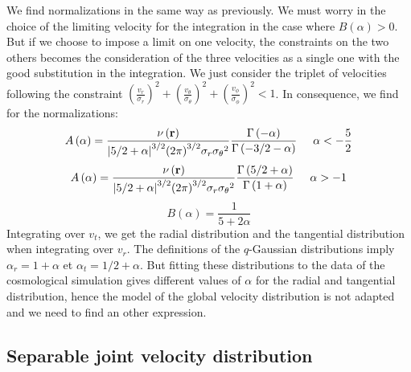 We find normalizations in the same way as previously. We must worry in the
choice of the limiting velocity for the integration in the case where
$B\left(\alpha\right)>0$. But if we choose to impose a limit on one
velocity, the constraints on the two others becomes the consideration of the
three velocities as a single one with the good substitution in the
integration. We just consider the triplet of velocities following the
constraint ${\left(\frac{v_r}{\sigma_r}\right)}^2+
{\left(\frac{v_\theta}{\sigma_\theta}\right)}^2+
{\left(\frac{v_\phi}{\sigma_\phi}\right)}^2<1$. In consequence, we find for
the normalizations:
%
\begin{equation}
    A\left(\alpha\right)=
    \frac{\nu\left(\textbf{r}\right)}
    {{\left|5/2+\alpha\right|}^{3/2}{\left(2\pi\right)}^{3/2}
        \sigma_r{\sigma_\theta}^2}
    \frac{\Gamma\left(-\alpha\right)}
        {\Gamma\left(-3/2-\alpha\right)}\hspace{0.5cm}\alpha<-\frac{5}{2}
\end{equation}
%
\begin{equation}
    A\left(\alpha\right)=
    \frac{\nu\left(\textbf{r}\right)}
    {{\left|5/2+\alpha\right|}^{3/2}{\left(2\pi\right)}^{3/2}
    \sigma_r{\sigma_\theta}^2}
    \frac{\Gamma\left(5/2+\alpha\right)}{\Gamma\left(1+\alpha\right)}
    \hspace{0.5cm}\alpha>-1
\end{equation}
%
\begin{equation}
    B\left(\alpha\right)=\frac{1}{5+2\alpha}
\end{equation}
%
Integrating over $v_t$, we get the radial distribution and the tangential
distribution when integrating over $v_r$. The definitions of the $q$-Gaussian
distributions imply $\alpha_r=1+\alpha$ et $\alpha_t=1/2+\alpha$. But
fitting these distributions to the data of the cosmological simulation gives
different values of $\alpha$ for the radial and tangential distribution,
hence the model of the global velocity distribution is not adapted and we
need to find an other expression.


\subsection{Separable joint velocity distribution}
\label{sub:different_alpha_forms}

